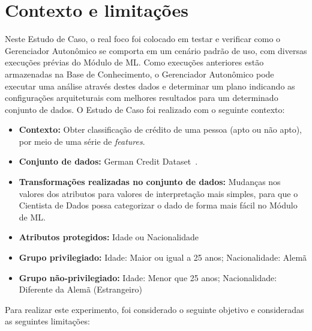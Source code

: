 \documentclass[portugues]{ic-tese}
\begin{document}
\section{Contexto e limitações}

Neste Estudo de Caso, o real foco foi colocado em testar e verificar como o Gerenciador Autonômico se comporta em um cenário padrão de uso, com diversas execuções prévias do Módulo de ML. Como execuções anteriores estão armazenadas na Base de Conhecimento, o Gerenciador Autonômico pode executar uma análise através destes dados e determinar um plano indicando as configurações arquiteturais com melhores resultados para um determinado conjunto de dados. O Estudo de Caso foi realizado com o seguinte contexto:

\begin{itemize}
\item \textbf{Contexto:} Obter classificação de crédito de uma pessoa (apto ou não apto), por meio de uma série de \textit{features}.

\item \textbf{Conjunto de dados:} German Credit Dataset~\citep{ucigerman_2021}.

\item \textbf{Transformações realizadas no conjunto de dados:} Mudanças nos valores dos atributos para valores de interpretação mais simples, para que o Cientista de Dados possa categorizar o dado de forma mais fácil no Módulo de ML.

\item \textbf{Atributos protegidos:} Idade ou Nacionalidade

\item \textbf{Grupo privilegiado:} Idade: Maior ou igual a 25 anos; Nacionalidade: Alemã

\item \textbf{Grupo não-privilegiado:} Idade: Menor que 25 anos; Nacionalidade: Diferente da Alemã (Estrangeiro)

\end{itemize}

Para realizar este experimento, foi considerado o seguinte objetivo e consideradas as seguintes limitações:
\end{document}

